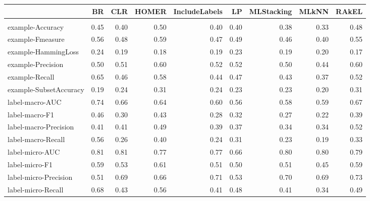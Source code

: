 \documentclass{acm_proc_article-sp}
\begin{document}
\begin{table*}
\begin{tabular}{l|rrrrrrrr}

  & BR & CLR & HOMER & IncludeLabels & LP & MLStacking & MLkNN & RAkEL \\

\hline \\

example-Accuracy & 0.45 & 0.40 & 0.50 & 0.40 & 0.40 & 0.38 & 0.33 & 0.48 \\

example-Fmeasure & 0.56 & 0.48 & 0.59 & 0.47 & 0.49 & 0.46 & 0.40 & 0.55 \\

example-HammingLoss & 0.24 & 0.19 & 0.18 & 0.19 & 0.23 & 0.19 & 0.20 & 0.17 \\

example-Precision & 0.50 & 0.51 & 0.60 & 0.52 & 0.52 & 0.50 & 0.44 & 0.60 \\

example-Recall & 0.65 & 0.46 & 0.58 & 0.44 & 0.47 & 0.43 & 0.37 & 0.52 \\

example-SubsetAccuracy & 0.19 & 0.24 & 0.31 & 0.24 & 0.23 & 0.23 & 0.20 & 0.31 \\

label-macro-AUC & 0.74 & 0.66 & 0.64 & 0.60 & 0.56 & 0.58 & 0.59 & 0.67 \\

label-macro-F1 & 0.46 & 0.30 & 0.43 & 0.28 & 0.32 & 0.27 & 0.22 & 0.39 \\

label-macro-Precision & 0.41 & 0.41 & 0.49 & 0.39 & 0.37 & 0.34 & 0.34 & 0.52 \\

label-macro-Recall & 0.56 & 0.26 & 0.40 & 0.24 & 0.31 & 0.23 & 0.19 & 0.33 \\

label-micro-AUC & 0.81 & 0.81 & 0.77 & 0.77 & 0.66 & 0.80 & 0.80 & 0.79 \\

label-micro-F1 & 0.59 & 0.53 & 0.61 & 0.51 & 0.50 & 0.51 & 0.45 & 0.59 \\

label-micro-Precision & 0.51 & 0.69 & 0.66 & 0.71 & 0.53 & 0.70 & 0.69 & 0.73 \\

label-micro-Recall & 0.68 & 0.43 & 0.56 & 0.41 & 0.48 & 0.41 & 0.34 & 0.49 \\


\end{tabular}
\end{table*}
\end{document}
